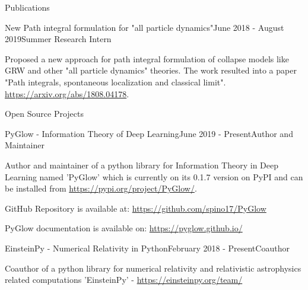 \documentclass{resume} %
\begin{document}
\begin{rSection}{Publications}

\begin{rSubsection}{New Path integral formulation for "all particle dynamics"}{June 2018 - August 2019}{Summer Research Intern}{}
\item Proposed a new approach for path integral formulation of collapse models like GRW and other "all particle dynamics" theories. The work resulted into a paper "Path integrals, spontaneous localization and classical limit". \url{https://arxiv.org/abs/1808.04178}.
\end{rSubsection}

\end{rSection}

\begin{rSection}{Open Source Projects}

\begin{rSubsection}{PyGlow - Information Theory of Deep Learning}{June 2019 - Present}{Author and Maintainer}{}
\item Author and maintainer of a python library for Information Theory in Deep Learning named 'PyGlow' which is currently on its 0.1.7 version on PyPI and can be installed from \url{https://pypi.org/project/PyGlow/}.
\item GitHub Repository is available at: \url{https://github.com/spino17/PyGlow}
\item PyGlow documentation is available on: \url{https://pyglow.github.io/}
\end{rSubsection}
\begin{rSubsection}{EinsteinPy - Numerical Relativity in Python}{February 2018 - Present}{Coauthor}{}
\item Coauthor of a python library for numerical relativity and relativistic astrophysics related computations 'EinsteinPy' - \url{https://einsteinpy.org/team/}
\end{rSubsection}

\end{rSection}
\end{document}
